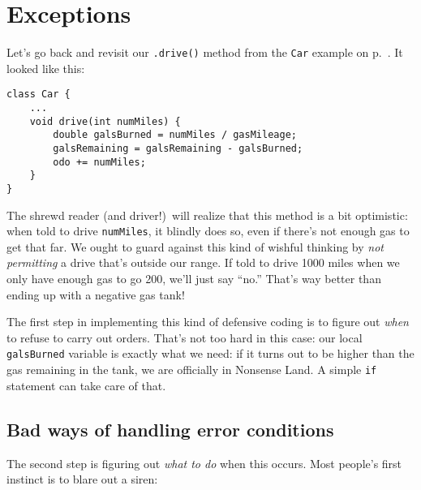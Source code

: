 \chapter{Exceptions}
\label{ch:exceptions}


Let's go back and revisit our \texttt{.drive()} method from the \texttt{Car}
example on p.~\pageref{fig:carClassCodePreExceptions}. It looked like this:

\vspace{-.2in}
\begin{Verbatim}[fontsize=\footnotesize,samepage=true,frame=single]
class Car {
    ...
    void drive(int numMiles) {
        double galsBurned = numMiles / gasMileage;
        galsRemaining = galsRemaining - galsBurned;
        odo += numMiles;
    }
}
\end{Verbatim}
\vspace{-.2in}

The shrewd reader (and driver!)~will realize that this method is a bit
optimistic: when told to drive \texttt{numMiles}, it blindly does so, even if
there's not enough gas to get that far. We ought to guard against this kind of
wishful thinking by \textit{not permitting} a drive that's outside our range.
If told to drive 1000 miles when we only have enough gas to go 200, we'll just
say ``no.'' That's way better than ending up with a negative gas tank!

The first step in implementing this kind of defensive coding is to figure out
\textit{when} to refuse to carry out orders. That's not too hard in this case:
our local \texttt{galsBurned} variable is exactly what we need: if it turns
out to be higher than the gas remaining in the tank, we are officially in
Nonsense Land. A simple \texttt{if} statement can take care of that.

\section{Bad ways of handling error conditions}

The second step is figuring out \textit{what to do} when this occurs. Most
people's first instinct is to blare out a siren:

